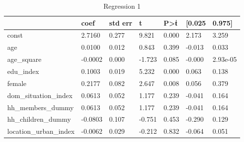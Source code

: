\documentclass{article}
\begin{document}
\begin{table}[h]
\centering
\caption{Regression 1}
\label{table:age_square}
\begin{tabular}{lllllll}
\hline
                       & coef    & std err & t      & P\textgreater{}\|t\| & {[}0.025 & 0.975{]} \\ \hline
const                  & 2.7160  & 0.277   & 9.821  & 0.000              & 2.173    & 3.259    \\
age                    & 0.0100  & 0.012   & 0.843  & 0.399              & -0.013   & 0.033    \\
age\_square            & -0.0002 & 0.000   & -1.723 & 0.085              & -0.000   & 2.93e-05 \\
edu\_index             & 0.1003  & 0.019   & 5.232  & 0.000              & 0.063    & 0.138    \\
female                 & 0.2177  & 0.082   & 2.647  & 0.008              & 0.056    & 0.379    \\
dom\_situation\_index  & 0.0613  & 0.052   & 1.177  & 0.239              & -0.041   & 0.164    \\
hh\_members\_dummy     & 0.0613  & 0.052   & 1.177  & 0.239              & -0.041   & 0.164    \\
hh\_children\_dummy    & -0.0803 & 0.107   & -0.751 & 0.453              & -0.290   & 0.129    \\
location\_urban\_index & -0.0062 & 0.029   & -0.212 & 0.832              & -0.064   & 0.051    \\ \hline
\end{tabular}
\end{table}
\end{document}
